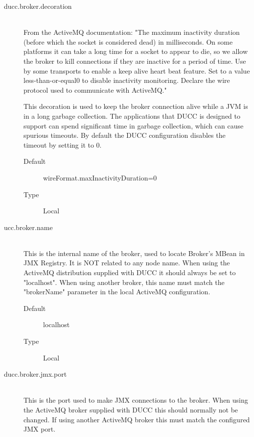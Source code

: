 \begin{description}
       \item[ducc.broker.decoration] \hfill \\
         From the ActiveMQ documentation: "The maximum inactivity duration
         (before which the socket is considered dead) in milliseconds. On some platforms it
         can take a long time for a socket to appear to die, so we allow the broker to kill
         connections if they are inactive for a period of time. Use by some transports to
         enable a keep alive heart beat feature. Set to a value less-than-or-equal0 to
         disable inactivity monitoring. Declare the wire protocol used to communicate with
         ActiveMQ."
         
         This decoration is used to keep the broker connection alive while a JVM is in a
         long garbage collection. The applications that DUCC is designed to support can
         spend significant time in garbage collection, which can cause spurious timeouts. By
         default the DUCC configuration disables the timeout by setting it to 0.
       
         \begin{description}
           \item[Default] wireFormat.maxInactivityDuration=0 
           \item[Type] Local 
         \end{description}
             
       \item[ucc.broker.name] \hfill \\
         This is the internal name of the broker, used to locate Broker's MBean in JMX Registry. 
         It is NOT related to any node name. When using the ActiveMQ distribution supplied with 
         DUCC it should always be set to "localhost". When using another broker, this name must 
         match the "brokerName" parameter in the local ActiveMQ configuration.          
         \begin{description}
           \item[Default] localhost 
           \item[Type] Local              
         \end{description}


       \item[ducc.broker.jmx.port] \hfill \\
         This is the port used to make JMX connections to the broker. When using the ActiveMQ 
         broker supplied with DUCC this should normally not be changed. If using another 
         ActiveMQ broker this must match the configured JMX port. 
         

\end{description}
